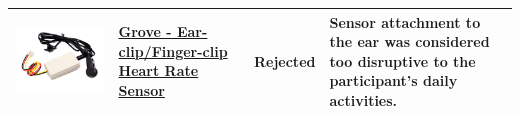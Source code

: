 \documentclass[12pt, titlepage]{article}
\begin{document}
\begin{table}[H]
\begin{tabular}{ | c | m{3cm} | c | m{7cm} |}
    \hline
    \includegraphics[scale = 0.25]{grove2}      & \href{https://www.seeedstudio.com/Grove-Ear-clip-Heart-Rate-Sensor.html?queryID=ad9334e40c7058a87ffd810044eecd1c                                                  & objectID=2143   & indexName=bazaar_retailer_products}{Grove - Ear-clip/Finger-clip Heart Rate Sensor}                                                                       & Rejected & Sensor attachment to the ear was considered too disruptive to the participant's daily activities. \\
    \hline

\end{tabular}
\end{table}
\end{document}
